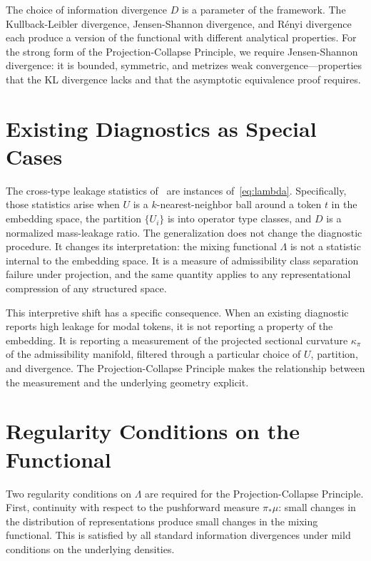 \documentclass[12pt, oneside]{book}
\theoremstyle{plain-flyxion}
\theoremstyle{definition-flyxion}
\newcommand{\kpi}{\kappa_{\pi}}
\newcommand{\Lam}{\Lambda}
\begin{document}
The choice of information divergence $D$ is a parameter of the framework. The
Kullback-Leibler divergence, Jensen-Shannon divergence, and Rényi divergence each produce
a version of the functional with different analytical properties. For the strong form of
the Projection-Collapse Principle, we require Jensen-Shannon divergence: it is bounded,
symmetric, and metrizes weak convergence---properties that the KL divergence lacks and
that the asymptotic equivalence proof requires.

\section{Existing Diagnostics as Special Cases}

The cross-type leakage statistics of~\cite{denham2025} are instances of~\eqref{eq:lambda}.
Specifically, those statistics arise when $U$ is a $k$-nearest-neighbor ball around a
token $t$ in the embedding space, the partition $\{U_i\}$ is into operator type classes,
and $D$ is a normalized mass-leakage ratio. The generalization does not change the
diagnostic procedure. It changes its interpretation: the mixing functional $\Lam$ is not
a statistic internal to the embedding space. It is a measure of admissibility class
separation failure under projection, and the same quantity applies to any representational
compression of any structured space.

This interpretive shift has a specific consequence. When an existing diagnostic reports
high leakage for modal tokens, it is not reporting a property of the embedding. It is
reporting a measurement of the projected sectional curvature $\kpi$ of the admissibility
manifold, filtered through a particular choice of $U$, partition, and divergence. The
Projection-Collapse Principle makes the relationship between the measurement and the
underlying geometry explicit.

\section{Regularity Conditions on the Functional}

Two regularity conditions on $\Lam$ are required for the Projection-Collapse Principle.
First, continuity with respect to the pushforward measure $\pi_*\mu$: small changes in
the distribution of representations produce small changes in the mixing functional. This
is satisfied by all standard information divergences under mild conditions on the
underlying densities.
\end{document}
